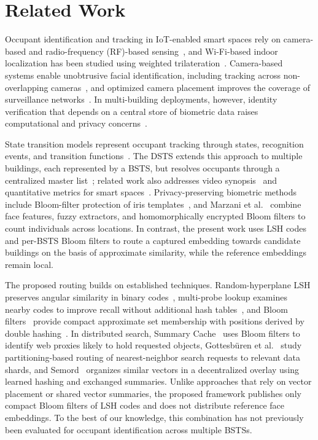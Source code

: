 \documentclass[pdflatex,sn-mathphys-num]{sn-jnl}%
\theoremstyle{thmstyleone}%
\theoremstyle{thmstyletwo}%
\theoremstyle{thmstylethree}%
\begin{document}
\section{Related Work}
\label{sec:related}

Occupant identification and tracking in IoT-enabled smart spaces rely on camera-based and radio-frequency (RF)-based sensing~\cite{mohan2020,WZSYGWLLHSC2025}, and Wi-Fi-based indoor localization has been studied using weighted trilateration~\cite{MSSAB2019}. Camera-based systems enable unobtrusive facial identification, including tracking across non-overlapping cameras~\cite{nair2021}, and optimized camera placement improves the coverage of surveillance networks~\cite{SM2022}. In multi-building deployments, however, identity verification that depends on a central store of biometric data raises computational and privacy concerns~\cite{mohan2020}.

State transition models represent occupant tracking through states, recognition events, and transition functions~\cite{MJG2011}. The DSTS extends this approach to multiple buildings, each represented by a BSTS, but resolves occupants through a centralized master list~\cite{mohan2020}; related work also addresses video synopsis~\cite{NGA2022} and quantitative metrics for smart spaces~\cite{MMJ2025}. Privacy-preserving biometric methods include Bloom-filter protection of iris templates~\cite{rathgeb2014}, and Marzani et al.~\cite{marzani2026} combine face features, fuzzy extractors, and homomorphically encrypted Bloom filters to count individuals across locations. In contrast, the present work uses LSH codes and per-BSTS Bloom filters to route a captured embedding towards candidate buildings on the basis of approximate similarity, while the reference embeddings remain local.

The proposed routing builds on established techniques. Random-hyperplane LSH preserves angular similarity in binary codes~\cite{charikar2002}, multi-probe lookup examines nearby codes to improve recall without additional hash tables~\cite{lv2007}, and Bloom filters~\cite{bloom1970} provide compact approximate set membership with positions derived by double hashing~\cite{kirsch2006}. In distributed search, Summary Cache~\cite{fan2000} uses Bloom filters to identify web proxies likely to hold requested objects, Gottesb{\"u}ren et al.~\cite{gottesbueren2024} study partitioning-based routing of nearest-neighbor search requests to relevant data shards, and Semord~\cite{wang2026semord} organizes similar vectors in a decentralized overlay using learned hashing and exchanged summaries. Unlike approaches that rely on vector placement or shared vector summaries, the proposed framework publishes only compact Bloom filters of LSH codes and does not distribute reference face embeddings. To the best of our knowledge, this combination has not previously been evaluated for occupant identification across multiple BSTSs.
\end{document}
